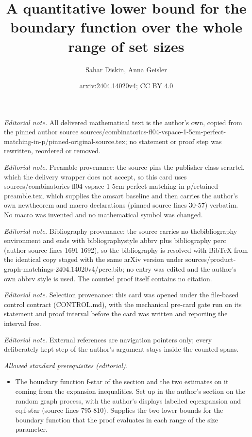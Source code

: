 \documentclass[10pt,a4paper]{amsart}
\title{A quantitative lower bound for the boundary function over the whole range of set sizes}
\author{Sahar Diskin, Anna Geisler}
\date{arxiv:2404.14020v4; CC BY 4.0}
\begin{document}
\maketitle
\noindent\textit{Editorial note.} All delivered mathematical text is the author's own, copied from the pinned author source sources/combinatorics-fl04-vspace-1-5cm-perfect-matching-in-p/pinned-original-source.tex; no statement or proof step was rewritten, reordered or removed.\par\medskip
\noindent\textit{Editorial note.} Preamble provenance: the source pins the publisher class scrartcl, which the delivery wrapper does not accept, so this card uses sources/combinatorics-fl04-vspace-1-5cm-perfect-matching-in-p/retained-preamble.tex, which supplies the amsart baseline and then carries the author's own newtheorem and macro declarations (pinned source lines 30-57) verbatim. No macro was invented and no mathematical symbol was changed.\par\medskip
\noindent\textit{Editorial note.} Bibliography provenance: the source carries no thebibliography environment and ends with bibliographystyle abbrv plus bibliography perc (author source lines 1691-1692), so the bibliography is resolved with BibTeX from the identical copy staged with the same arXiv version under sources/product-graph-matchings-2404.14020v4/perc.bib; no entry was edited and the author's own abbrv style is used. The counted proof itself contains no citation.\par\medskip
\noindent\textit{Editorial note.} Selection provenance: this card was opened under the file-based control contract (CONTROL.md), with the mechanical pre-card gate run on its statement and proof interval before the card was written and reporting the interval free.\par\medskip
\noindent\textit{Editorial note.} External references are navigation pointers only; every deliberately kept step of the author's argument stays inside the counted spans.\par\medskip
\noindent\textit{Allowed standard prerequisites (editorial).}\begin{itemize}
\item The boundary function f-star of the section and the two estimates on it coming from the expansion inequalities. Set up in the author's section on the random graph process, with the author's displays labelled eq:expansion and eq:f-star (source lines 795-810). Supplies the two lower bounds for the boundary function that the proof evaluates in each range of the size parameter.
\end{itemize}\medskip
\end{document}

